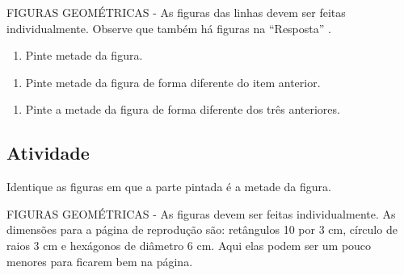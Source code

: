 \documentclass[a4,12pt]{book}
\begin{document}
\begin{imagem*}[breakable]{}{}   FIGURAS GEOMÉTRICAS - As figuras das linhas devem ser feitas individualmente. Observe que também há figuras na   ``Resposta''  .  
\end{imagem*}
\begin{enumerate} [\quad a)] %
  \item     Pinte metade da figura. 
\end{enumerate} %
\mbox{} \newline  %
\begin{enumerate} [\quad a)] %
  \item     Pinte metade da figura de forma diferente do item anterior. 
\end{enumerate} %
\mbox{} \newline  %
\begin{enumerate} [\quad a)] %
  \item     Pinte a metade da figura de forma diferente dos três anteriores. 
\end{enumerate} %
\mbox{} \newline  %







\subsection{Atividade}








Identique as figuras em que a parte pintada é a metade da figura.
\begin{imagem*}[breakable]{}{}    FIGURAS GEOMÉTRICAS - As figuras devem ser feitas individualmente. As dimensões para a página de reprodução são: retângulos 10 por 3 cm, círculo de raios 3 cm e hexágonos de diâmetro 6 cm. Aqui elas podem ser um pouco menores para ficarem bem na página.  
\end{imagem*}
\end{document}
